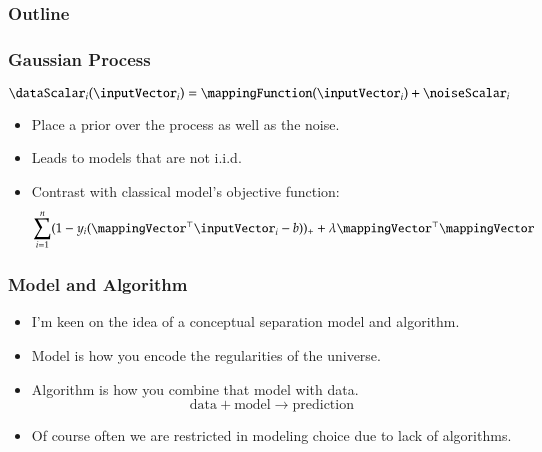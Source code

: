 \frame{\maketitle}
\begin{frame}
  \frametitle{Outline}

  \tableofcontents[hideallsubsections] 

\end{frame}
\begin{frame}
  \frametitle{Gaussian Process}
  \[
  \dataScalar_i(\inputVector_i) = \mappingFunction(\inputVector_i) + \noiseScalar_i
  \]
  \begin{itemize}
  \item Place a prior over the process as well as the noise.
  \item Leads to models that are not i.i.d.
    \item Contrast with classical model's objective function:
    \[
    \sum_{i=1}^n (1 - y_i(\mappingVector^\top\inputVector_i - b))_{+} + \lambda \mappingVector^\top\mappingVector
    \]
  \end{itemize}
\end{frame}
\begin{frame}
  \frametitle{Model and Algorithm}
  \begin{itemize}
  \item I'm keen on the idea of a conceptual separation model and algorithm.
  \item Model is how you encode the regularities of the universe.
  \item Algorithm is how you combine that model with data.
    \[
    \text{data} + \text{model} \rightarrow \text{prediction}
    \]
    \item Of course often we are restricted in modeling choice due to lack of algorithms.
  \end{itemize}
\end{frame}
    



